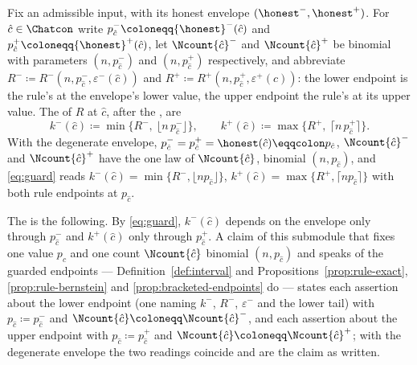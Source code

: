 \begin{definition}
Fix an admissible input, with its honest envelope
$({\honest}^{-},{\honest}^{+})$. For $\hat c\in\Chatcon$ write
$p^{-}_{\hat c}\coloneqq{\honest}^{-}(\hat c)$ and
$p^{+}_{\hat c}\coloneqq{\honest}^{+}(\hat c)$, let $\Ncount{\hat c}^{-}$ and
$\Ncount{\hat c}^{+}$ be binomial with parameters $(n,p^{-}_{\hat c})$ and
$(n,p^{+}_{\hat c})$ respectively, and abbreviate
$R^{-}\coloneqq R^{-}(n,p^{-}_{\hat c},\varepsilon^{-}(\hat c))$ and
$R^{+}\coloneqq R^{+}(n,p^{+}_{\hat c},\varepsilon^{+}(\hat c))$: the lower
endpoint is the rule's at the envelope's lower value, the upper endpoint the
rule's at its upper value. The  of $R$ at $\hat c$, after the
, are
\begin{equation}\label{eq:guard}
  k^{-}(\hat c)\coloneqq\min\big\{R^{-},\ \lfloor n\,p^{-}_{\hat c}\rfloor\big\},
  \qquad
  k^{+}(\hat c)\coloneqq\max\big\{R^{+},\ \lceil n\,p^{+}_{\hat c}\rceil\big\}.
\end{equation}
With the degenerate envelope, $p^{-}_{\hat c}=p^{+}_{\hat c}=\honest(\hat c)
\eqqcolon p_{\hat c}$, $\Ncount{\hat c}^{-}$ and $\Ncount{\hat c}^{+}$ have
the one law of $\Ncount{\hat c}$, binomial $(n,p_{\hat c})$, and
\eqref{eq:guard} reads $k^{-}(\hat c)=\min\{R^{-},\lfloor np_{\hat
c}\rfloor\}$, $k^{+}(\hat c)=\max\{R^{+},\lceil np_{\hat c}\rceil\}$ with both
rule endpoints at $p_{\hat c}$.

The  is the following. By
\eqref{eq:guard}, $k^{-}(\hat c)$ depends on the envelope only through
$p^{-}_{\hat c}$ and $k^{+}(\hat c)$ only through $p^{+}_{\hat c}$. A claim of
this submodule that fixes one value $p_{\hat c}$ and one count
$\Ncount{\hat c}$ binomial $(n,p_{\hat c})$ and speaks of the guarded
endpoints --- Definition~\ref{def:interval} and
Propositions~\ref{prop:rule-exact}, \ref{prop:rule-bernstein} and
\ref{prop:bracketed-endpoints} do --- states each assertion about the lower
endpoint (one naming $k^{-}$, $R^{-}$, $\varepsilon^{-}$ and the lower tail)
with $p_{\hat c}\coloneqq p^{-}_{\hat c}$ and
$\Ncount{\hat c}\coloneqq\Ncount{\hat c}^{-}$, and each assertion about the
upper endpoint with $p_{\hat c}\coloneqq p^{+}_{\hat c}$ and
$\Ncount{\hat c}\coloneqq\Ncount{\hat c}^{+}$; with the degenerate envelope
the two readings coincide and are the claim as written.
\end{definition}

